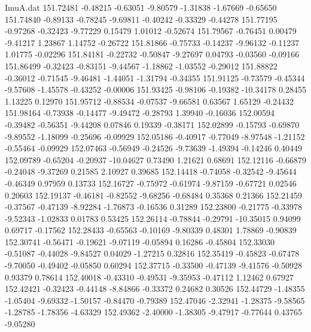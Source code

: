 \begin{filecontents}{ImuA.dat}
 151.72481   -0.48215   -0.63051   -9.80579   -1.31838   -1.67669   -0.65650
 151.74840   -0.89133   -0.78245   -9.69811   -0.40242   -0.33329   -0.44278
 151.77195   -0.97268   -0.32423   -9.77229    0.15479    1.01012   -0.52674
 151.79567   -0.76451    0.00479   -9.41217    1.23867    1.14752   -0.26722
 151.81866   -0.75733   -0.14237   -9.96132   -0.11237    1.01775   -0.02296
 151.84181   -0.22732   -0.50847   -9.27697    0.04793   -0.03560   -0.09166
 151.86499   -0.32423   -0.83151   -9.44567   -1.18862   -1.03552   -0.29012
 151.88822   -0.36012   -0.71545   -9.46481   -1.44051   -1.31794   -0.34355
 151.91125   -0.73579   -0.45344   -9.57608   -1.45578   -0.43252   -0.00006
 151.93425   -0.98106   -0.19382  -10.34178    0.28455    1.13225    0.12970
 151.95712   -0.88534   -0.07537   -9.66581    0.63567    1.65129   -0.24432
 151.98164   -0.73938   -0.14477   -9.49472   -0.28793    1.39940   -0.16036
 152.00594   -0.39482   -0.56351   -9.44208    0.07846    0.19339   -0.38171
 152.02899   -0.15793   -0.69870   -9.89552   -1.18099   -0.25696   -0.09929
 152.05186   -0.40917   -0.77049   -8.97548   -1.21152   -0.55464   -0.09929
 152.07463   -0.56949   -0.24526   -9.73639   -1.49394   -0.14246    0.40449
 152.09789   -0.65204   -0.20937  -10.04627    0.73490    1.21621    0.68691
 152.12116   -0.66879   -0.24048   -9.37269    0.21585    2.10927    0.39685
 152.14418   -0.74058   -0.32542   -9.45644   -0.46349    0.97959    0.13733
 152.16727   -0.75972   -0.61974   -9.87159   -0.67721    0.02546    0.20603
 152.19137   -0.46181   -0.82552   -9.68256   -0.68484    0.35368    0.21366
 152.21459   -0.37567   -0.47139   -8.92284   -1.76873   -0.16536    0.31289
 152.23800   -0.21775   -0.33978   -9.52343   -1.02833    0.01783    0.53425
 152.26114   -0.78844   -0.29791  -10.35015    0.94099    0.69717   -0.17562
 152.28433   -0.65563   -0.10169   -9.80339    0.48301    1.78869   -0.90839
 152.30741   -0.56471   -0.19621   -9.07119   -0.05894    0.16286   -0.45804
 152.33030   -0.51087   -0.44028   -9.84527    0.04029   -1.27215    0.32816
 152.35419   -0.45823   -0.67478   -9.70050   -0.49402   -0.05850    0.60294
 152.37715   -0.33500   -0.47139   -9.41576   -0.50928    0.93379    0.78614
 152.40018   -0.43310   -0.49531   -9.35953   -0.47112    1.12462    0.67927
 152.42421   -0.32423   -0.44148   -8.84866   -0.33372    0.24682    0.30526
 152.44729   -1.48355   -1.05404   -9.69332   -1.50157   -0.84470   -0.79389
 152.47046   -2.32941   -1.28375   -9.58565   -1.28785   -1.78356   -4.63329
 152.49362   -2.40000   -1.38305   -9.47917   -0.77644    0.43765   -9.05280

\end{filecontents}
